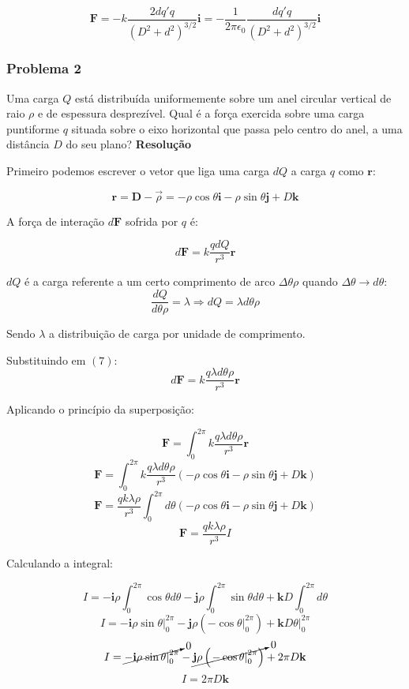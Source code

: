 \documentclass[a4paper, 12pt]{article}
\begin{document}
	\[
	\textbf{F}=-k\frac{2dq'q}{\left(D^2+d^ 2\right)^{3/2}}\textbf{i}=-\frac{1}{2\pi\epsilon_0}\frac{dq'q}{\left(D^2+d^ 2\right)^{3/2}}\textbf{i}
	\]
	
	\subsubsection{Problema 2}
	Uma carga $Q$ está distribuída uniformemente sobre um anel circular vertical de raio $\rho$ e de espessura desprezível. Qual é a força exercida sobre uma carga puntiforme $q$ situada sobre o eixo horizontal que passa pelo centro do anel, a uma distância $D$ do seu plano?
	\textbf{Resolução}
	
	Primeiro podemos escrever o vetor que liga uma carga $dQ$ a carga $q$ como $\textbf{r}$:
	
	\[
	\textbf{r}=\textbf{D}-\vec{\rho}=-\rho\cos\theta\textbf{i}-\rho\sin\theta\textbf{j}+D\textbf{k}
	\]
	
	A força de interação $d\textbf{F}$ sofrida por $q$ é:
	
	\begin{equation}
		d\textbf{F}=k\frac{qdQ}{r^3}\textbf{r}
	\end{equation}
	
	$dQ$ é a carga referente a um certo comprimento de arco $\Delta\theta\rho$ quando $\Delta\theta\to d\theta$:
	\[
	\frac{dQ}{d\theta\rho}=\lambda\Rightarrow dQ=\lambda d\theta\rho
	\]
	
	Sendo $\lambda$ a distribuição de carga por unidade de comprimento.
	
	Substituindo em $(7)$:
	\[
	d\textbf{F}=k\frac{q\lambda d\theta\rho}{r^3}\textbf{r}
	\]
	
	Aplicando o princípio da superposição:
	
	\[
	\textbf{F}=\int_{0}^{2\pi}k\frac{q\lambda d\theta\rho}{r^3}\textbf{r}
	\]
	\[
	\textbf{F}=\int_{0}^{2\pi}k\frac{q\lambda d\theta\rho}{r^3}\left(-\rho\cos\theta\textbf{i}-\rho\sin\theta\textbf{j}+D\textbf{k}\right)
	\]
	\[
	\textbf{F}=\frac{qk\lambda\rho}{r^3}\int_{0}^{2\pi}d\theta\left(-\rho\cos\theta\textbf{i}-\rho\sin\theta\textbf{j}+D\textbf{k}\right)
	\]
	\[
	\textbf{F}=\frac{qk\lambda\rho}{r^3}I
	\]
	
	Calculando a integral:
	
	\[
	I=-\textbf{i}\rho\int_{0}^{2\pi}\cos\theta d\theta-\textbf{j}\rho\int_{0}^{2\pi}\sin\theta d\theta+\textbf{k}D\int_{0}^{2\pi}d\theta
	\]
	\[
	I=-\textbf{i}\rho\left.\sin\theta\right|_{0}^{2\pi}-\textbf{j}\rho\left(\left.-\cos\theta\right|_{0}^{2\pi}\right)+\textbf{k}D\left.\theta\right|_{0}^{2\pi}
	\]
	\[
	I=\cancelto{0}{-\textbf{i}\rho\left.\sin\theta\right|_{0}^{2\pi}}-\cancelto{0}{\textbf{j}\rho\left(\left.-\cos\theta\right|_{0}^{2\pi}\right)}+2\pi D\textbf{k}
	\]
	\[
	I=2\pi D\textbf{k}
	\]
	
\end{document}

